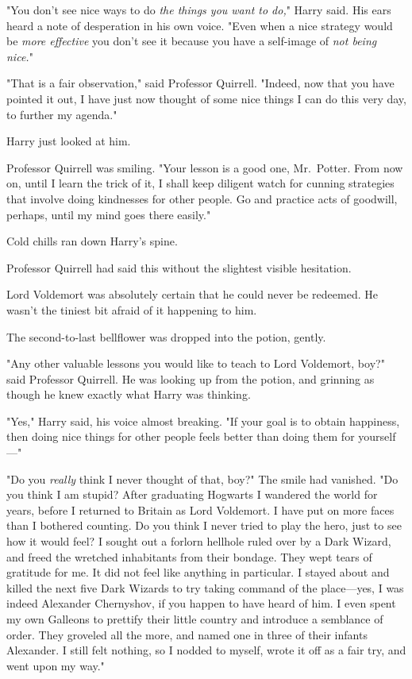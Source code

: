 "You don't see nice ways to do \emph{the things you want to do,}" Harry said. 
His ears heard a note of desperation in his own voice. "Even when a nice 
strategy would be \emph{more effective} you don't see it because you have a 
self-image of \emph{not being nice.}"

"That is a fair observation," said Professor Quirrell. "Indeed, now that you 
have pointed it out, I have just now thought of some nice things I can do this 
very day, to further my agenda."

Harry just looked at him.

Professor Quirrell was smiling. "Your lesson is a good one, Mr.~Potter. From 
now on, until I learn the trick of it, I shall keep diligent watch for cunning 
strategies that involve doing kindnesses for other people. Go and practice acts 
of goodwill, perhaps, until my mind goes there easily."

Cold chills ran down Harry's spine.

Professor Quirrell had said this without the slightest visible hesitation.

Lord Voldemort was absolutely certain that he could never be redeemed. He 
wasn't the tiniest bit afraid of it happening to him.

The second-to-last bellflower was dropped into the potion, gently.

"Any other valuable lessons you would like to teach to Lord Voldemort, boy?" 
said Professor Quirrell. He was looking up from the potion, and grinning as 
though he knew exactly what Harry was thinking.

"Yes," Harry said, his voice almost breaking. "If your goal is to obtain 
happiness, then doing nice things for other people feels better than doing them 
for yourself---"

"Do you \emph{really} think I never thought of that, boy?" The smile had 
vanished. "Do you think I am stupid? After graduating Hogwarts I wandered the 
world for years, before I returned to Britain as Lord Voldemort. I have put on 
more faces than I bothered counting. Do you think I never tried to play the 
hero, just to see how it would feel? I sought out a forlorn hellhole ruled over 
by a Dark Wizard, and freed the wretched inhabitants from their bondage. They 
wept tears of gratitude for me. It did not feel like anything in particular. I 
stayed about and killed the next five Dark Wizards to try taking command of the 
place---yes, I was indeed Alexander Chernyshov, if you happen to have heard of 
him. I even spent my own Galleons to prettify their little country and 
introduce a semblance of order. They groveled all the more, and named one in 
three of their infants Alexander. I still felt nothing, so I nodded to myself, 
wrote it off as a fair try, and went upon my way."

